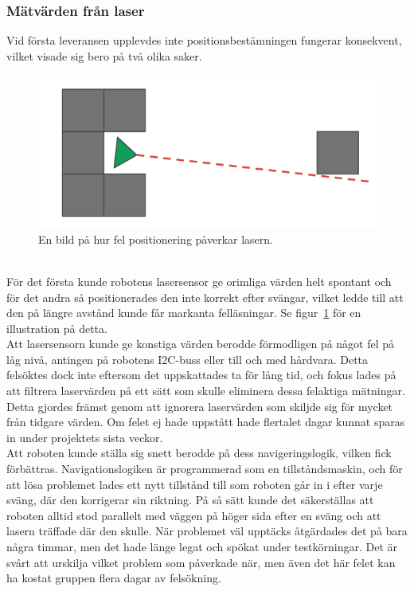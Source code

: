 ﻿\documentclass{article}
\begin{document}
\subsubsection{Mätvärden från laser}
Vid första leveransen upplevdes inte positionsbestämningen fungerar konsekvent, vilket visade sig bero på två olika saker. 
\begin{figure}[H]
\centering
\includegraphics[scale=0.5]{wrongly_positioned_laser}
\caption{En bild på hur fel positionering påverkar lasern.}
\label{fig:wrongly_positioned_laser}
\end{figure}
\ \\
För det första kunde robotens lasersensor ge orimliga värden helt spontant och för det andra så positionerades den inte korrekt efter svängar, vilket ledde till att den på längre avstånd kunde får markanta felläsningar. Se figur~\ref{fig:wrongly_positioned_laser} för en illustration på detta.
\\
Att lasersensorn kunde ge konstiga värden berodde förmodligen på något fel på låg nivå, antingen på robotens I2C-buss eller till och med hårdvara. Detta felsöktes dock inte eftersom det uppskattades ta för lång tid, och fokus lades på att filtrera laservärden på ett sätt som skulle eliminera dessa felaktiga mätningar. Detta gjordes främst genom att ignorera laservärden som skiljde sig för mycket från tidgare värden. Om felet ej hade uppstått hade flertalet dagar kunnat sparas in under projektets sista veckor.
\\
Att roboten kunde ställa sig snett berodde på dess navigeringslogik, vilken fick förbättras. Navigationslogiken är programmerad som en tillståndsmaskin, och för att lösa problemet lades ett nytt tillstånd till som roboten går in i efter varje sväng, där den korrigerar sin riktning. På så sätt kunde det säkerställas att roboten alltid stod parallelt med väggen på höger sida efter en sväng och att lasern träffade där den skulle. När problemet väl upptäcks åtgärdades det på bara några timmar, men det hade länge legat och spökat under testkörningar. Det är svårt att urskilja vilket problem som påverkade när, men även det här felet kan ha kostat gruppen flera dagar av felsökning.
\end{document}
